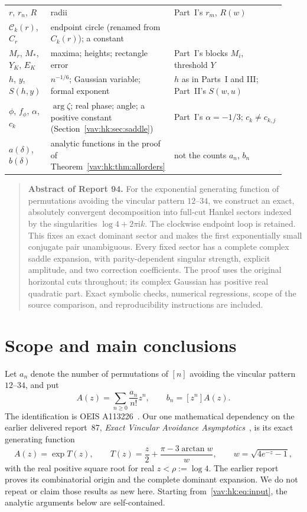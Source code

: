 \documentclass[11pt]{article}
\theoremstyle{remark}\newtheorem{remark}[theorem]{Remark}
\newcommand{\ii}{\mathrm i}
\begin{document}
\begin{table}[H]
\begin{tabular}{@{}>{\raggedright}p{0.15\linewidth}>{\raggedright}p{0.38\linewidth}>{\raggedright\arraybackslash}p{0.40\linewidth}@{}}
$r$, $r_n$, $R$ & radii & Part~I's $r_m$, $R(w)$\\
$\mathcal C_k(r)$, $C_r$ & endpoint circle (renamed from $C_k(r)$); a constant & \\
$M_r$, $M_*$, $Y_K$, $E_K$ & maxima; heights; rectangle error & Part~I's blocks $M_i$, threshold $Y$\\
$h$, $y$, $S(h,y)$ & $n^{-1/6}$; Gaussian variable; formal exponent & $h$ as in Parts~I and III; Part~II's $S(w,u)$\\
$\phi$, $f_\phi$, $\alpha$, $c_k$ & $\arg\zeta$; real phase; angle; a positive constant (Section~\ref{vav:hk:sec:saddle}) & Part~I's $\alpha=-1/3$; $c_k\ne c_{k,j}$\\
$a(\delta)$, $b(\delta)$ & analytic functions in the proof of Theorem~\ref{vav:hk:thm:allorders} & not the counts $a_n$, $b_n$\\
\bottomrule
\end{tabular}
\end{table}

\begin{quote}\small
\textbf{Abstract of Report 94.}
For the exponential generating function of permutations avoiding the vincular pattern $12$--$34$, we construct an exact, absolutely convergent decomposition into full-cut Hankel sectors indexed by the singularities $\log 4+2\pi\ii k$. The clockwise endpoint loop is retained. This fixes an exact dominant sector and makes the first exponentially small conjugate pair unambiguous. Every fixed sector has a complete complex saddle expansion, with parity-dependent singular strength, explicit amplitude, and two correction coefficients. The proof uses the original horizontal cuts throughout; its complex Gaussian has positive real quadratic part. Exact symbolic checks, numerical regressions, scope of the source comparison, and reproducibility instructions are included.
\end{quote}

\section{Scope and main conclusions}\label{vav:hk:sec:scope}
Let $a_n$ denote the number of permutations of $[n]$ avoiding the vincular pattern $12$--$34$, and put
\[
 A(z)=\sum_{n\geq0}\frac{a_n}{n!}z^n,\qquad b_n=[z^n]A(z).
\]
The identification is OEIS A113226~\cite{oeis}. Our one mathematical dependency on the earlier delivered report~87, \emph{Exact Vincular Avoidance Asymptotics}~\cite{hkprior}, is its exact generating function
\begin{equation}\label{vav:hk:eq:input}
 A(z)=\exp T(z),\qquad
 T(z)=\frac z2+\frac{\pi-3\arctan w}{w},\qquad
 w=\sqrt{4e^{-z}-1},
\end{equation}
with the real positive square root for real $z<\rho:=\log4$. The earlier report proves its combinatorial origin and the complete dominant expansion. We do not repeat or claim those results as new here. Starting from~\eqref{vav:hk:eq:input}, the analytic arguments below are self-contained.
\end{document}
